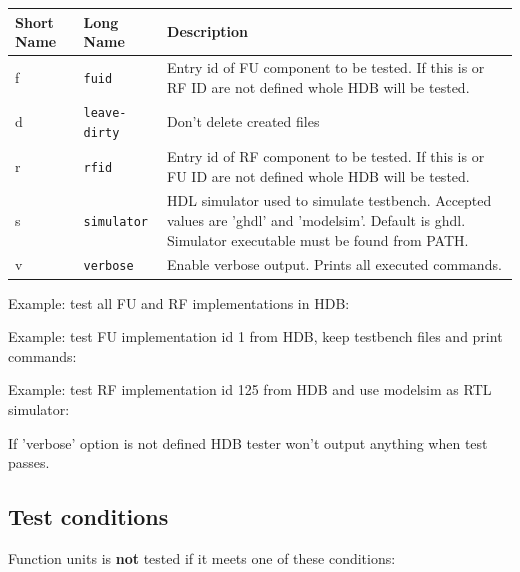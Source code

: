 \documentclass[a4paper,twoside]{tceusermanual}
\begin{document}
\begin{center}
\begin{tabular}[htb]{@{}p{}@{}p{}%
                     @{}p{}}

\textbf{Short Name} &\textbf{Long Name} &\textbf{Description} \\
\hline

f & \verb|fuid| &
Entry id of FU component to be tested. If this is or RF ID are not defined
whole HDB will be tested. \\

d & \verb|leave-dirty| &
Don't delete created files \\

r & \verb|rfid| &
Entry id of RF component to be tested. If this is or FU ID are not defined
whole HDB will be tested. \\

s & \verb|simulator| &
HDL simulator used to simulate testbench. Accepted values are 'ghdl' and
'modelsim'. Default is ghdl. Simulator executable must be found from PATH. \\

v & \verb|verbose| &
Enable verbose output. Prints all executed commands. \\

\end{tabular}
\end{center}

Example: test all FU and RF implementations in HDB:


Example: test FU implementation id 1 from HDB, keep testbench files and print
commands:


Example: test RF implementation id 125 from HDB and use modelsim as RTL
simulator:


If 'verbose' option is not defined HDB tester won't output anything when test
passes.

\subsection{Test conditions}

Function units is \textbf{not} tested if it meets one of these conditions:
\end{document}
